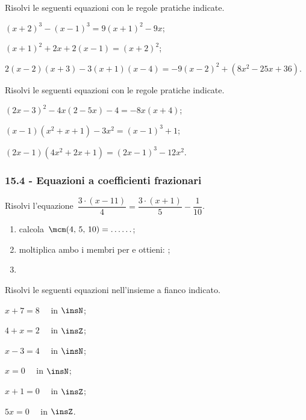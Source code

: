 \begin{esercizio}[\Ast]
\label{ese:15.17}
Risolvi le seguenti equazioni con le regole pratiche indicate.
 \begin{enumeratea}
 \item $(x+2)^{3}-(x-1)^{3}=9(x+1)^{2}-9x$;
 \item $(x+1)^{2}+2x+2(x-1)=(x+2)^{2}$;
 \item $2(x-2)(x+3)-3(x+1)(x-4)=-9(x-2)^{2}+\left(8x^{2}-25x+36\right)$.
 \end{enumeratea}
\end{esercizio}

\begin{esercizio}
\label{ese:15.18}
Risolvi le seguenti equazioni con le regole pratiche indicate.
 \begin{enumeratea}
 \item $(2x-3)^{2}-4x(2-5x)-4=-8x(x+4)$;
 \item $(x-1)\left(x^{2}+x+1\right)-3x^{2}=(x-1)^{3}+1$;
 \item $(2x-1)\left(4x^{2}+2x+1\right)=(2x-1)^{3}-12x^{2}$.
 \end{enumeratea}
\end{esercizio}

\subsubsection*{15.4 - Equazioni a coefficienti frazionari}

\begin{esercizio}
\label{ese:15.19}
Risolvi l'equazione~$\dfrac{3\cdot (x-11)}{4}=\dfrac{3\cdot (x+1)}{5}-\dfrac{1}{10}$.
\begin{enumerate}
\spazielenx
 \item calcola~$\mcm(4\text{,~}5\text{,~}10) = \ldots \ldots$;
 \item moltiplica ambo i membri per \dotfill e ottieni: \dotfill;
 \item \dotfill
\end{enumerate}
\end{esercizio}

\begin{esercizio}
\label{ese:15.20}
Risolvi le seguenti equazioni nell'insieme a fianco indicato.
\begin{multicols}{3}
\begin{enumeratea}
\spazielenx
 \item $x+7=8\quad$ in $\insN$;
 \item $4+x=2\quad$ in $\insZ$;
 \item $x-3=4\quad$ in $\insN$;
 \item $x=0\quad$ in $\insN$;
 \item $x+1=0\quad$ in $\insZ$;
 \item $5x=0\quad$ in $\insZ$.
\end{enumeratea}
\end{multicols}
\end{esercizio}
\pagebreak

